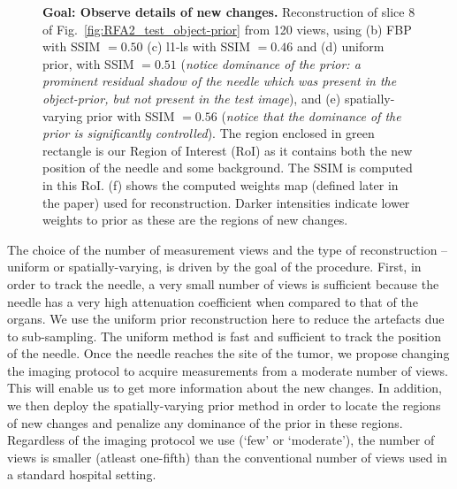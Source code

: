 \documentclass[journal]{IEEEtran}
\begin{document}
\begin{figure}[!h]
\caption[Representative results-2]{\textbf{Goal: Observe details of new changes.} Reconstruction of slice 8 of Fig.~\ref{fig:RFA2_test_object-prior} from 120 views, using (b) FBP with SSIM $= 0.50$ (c) l1-ls with SSIM $=0.46$ and (d) uniform prior, with SSIM $=0.51$ (\emph{notice dominance of the prior: a prominent residual shadow of the needle which was present in the object-prior, but not present in the test image}), and (e) spatially-varying prior with SSIM $=0.56$ (\emph{notice that the dominance of the prior is significantly controlled}). The region enclosed in green rectangle is our Region of Interest (RoI) as it contains both the new position of the needle and some background. The SSIM is computed in this RoI. (f) shows the computed weights map (defined later in the paper) used for reconstruction. Darker intensities indicate lower weights to prior as these are the regions of new changes.}
\label{fig:RFA2_few_views}
\end{figure}

The choice of the number of
measurement views and the type of reconstruction -- uniform or
spatially-varying, is driven by the goal of the procedure. First, in
order to track the needle, a very small number of views is sufficient
because the needle has a very high attenuation coefficient when
compared to that of the organs. We use the uniform prior
reconstruction here to reduce the artefacts due to sub-sampling. The
uniform method is fast and sufficient to track the position of the
needle.  Once the needle reaches the site of the tumor, we propose
changing the imaging protocol to acquire measurements from a moderate
number of views. This will enable us to get more information about the
new changes. In addition, we then deploy the spatially-varying prior
method in order to locate the regions of new changes and penalize any
dominance of the prior in these regions.  Regardless of the imaging
protocol we use (`few' or `moderate'), the number of views is smaller
(atleast one-fifth) than the conventional number of views used in a
standard hospital setting.
\end{document}

